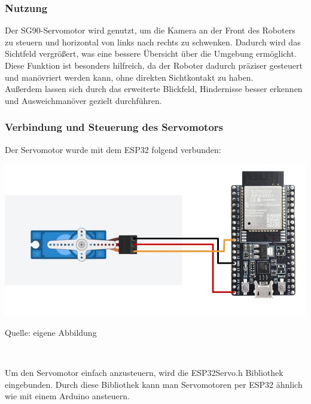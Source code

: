 \documentclass[ngerman,12pt,a4paper]{article}
\begin{document}
				\subsubsection{Nutzung} %
				Der SG90-Servomotor wird genutzt, um die Kamera an der Front des Roboters zu steuern und horizontal von links nach rechts zu schwenken. Dadurch wird das Sichtfeld vergrößert, was eine bessere Übersicht über die Umgebung ermöglicht. \\
				Diese Funktion ist besonders hilfreich, da der Roboter dadurch präziser gesteuert und manövriert werden kann, ohne direkten Sichtkontakt zu haben.\\
				Außerdem lassen sich durch das erweiterte Blickfeld, Hindernisse besser erkennen und Ausweichmanöver gezielt durchführen.
				\subsubsection{Verbindung und Steuerung des Servomotors} %
				
				Der Servomotor wurde mit dem ESP32 folgend verbunden:
				
				\begin{center}
					\begin{minipage}[t]{\textwidth}
						\includegraphics[scale=0.6]{Pictures/servo_verkabelung}
						\label{fig:servo_verkabelung}
						\vspace{-10pt}
						\begin{center}
							\par\small Quelle: eigene Abbildung 
						\end{center}
					\end{minipage} \\[0.70cm]
				\end{center}
				
				\noindent
				Um den Servomotor einfach anzusteuern, wird die ESP32Servo.h Bibliothek eingebunden. Durch diese Bibliothek kann man Servomotoren per ESP32 ähnlich wie mit einem Arduino ansteuern.
				
\end{document}
